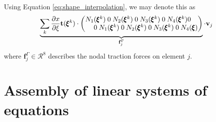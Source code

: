 Using Equation \eqref{eq:shape_interpolation}, we may denote this as 
\begin{equation}
    \setlength\arraycolsep{-5pt}
    \underbrace{\sum_k \frac{\partial x}{\partial \xi} \mathbf{t}(\pmb{\xi}^k) \cdot
    \begin{pmatrix}
            N_1(\pmb{\xi}^k) & 0 & N_2(\pmb{\xi}^k) & 0 & N_3(\pmb{\xi}^k) & 0 & N_4(\pmb{\xi}^k) & 0\\
            0 & N_1(\pmb{\xi}^k) & 0 & N_2(\pmb{\xi}^k) & 0 & N_3(\pmb{\xi}^k) & 0 & N_4(\pmb{\xi})\\
    \end{pmatrix}}_{\mathbf{f}^\Gamma_j}
    \cdot 
    \mathbf{v}_j
\end{equation}
where $\mathbf{f}^\Gamma_j \in \mathcal{R}^8$ describes the nodal traction forces on element $j$. 

\section{Assembly of linear systems of equations}

